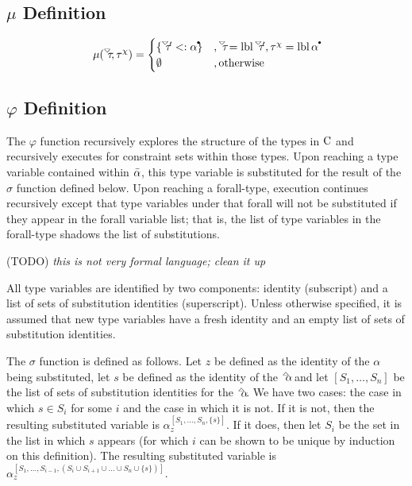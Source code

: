 \documentclass{article}
\begin{document}
\subsection*{$\mu$ Definition}

$$
\mu(\tauDownOpen, \tauChi) =
    \begin{cases}
        \{ \tauDownOpen' <: \alphaClosed \}             &, \tauDownOpen = \lbl \tauDownOpen', \tauChi = \lbl \alphaClosed \\
        \emptyset                                       &, \text{otherwise}
    \end{cases}
$$

\subsection*{$\varphi$ Definition}

The $\varphi$ function recursively explores the structure of the types in $\operatorname{\textrm{C}}$ and recursively executes for constraint sets within those types.  Upon reaching a type variable contained within $\bar{\alpha}$, this type variable is substituted for the result of the $\sigma$ function defined below.  Upon reaching a forall-type, execution continues recursively except that type variables under that forall will not be substituted if they appear in the forall variable list; that is, the list of type variables in the forall-type shadows the list of substitutions.

(TODO) \textit{this is not very formal language; clean it up}

All type variables are identified by two components: identity (subscript) and a list of sets of substitution identities (superscript).  Unless otherwise specified, it is assumed that new type variables have a fresh identity and an empty list of sets of substitution identities.

The $\sigma$ function is defined as follows.  Let $z$ be defined as the identity of the $\alpha$ being substituted, let $s$ be defined as the identity of the $\alphaUp$ and let $[S_1,\ldots,S_n]$ be the list of sets of substitution identities for the $\alphaUp$.  We have two cases: the case in which $s \in S_i$ for some $i$ and the case in which it is not.  If it is not, then the resulting substituted variable is $\alpha_z^{[S_1,\ldots,S_n,\{s\}]}$.  If it does, then let $S_i$ be the set in the list in which $s$ appears (for which $i$ can be shown to be unique by induction on this definition).  The resulting substituted variable is $\alpha_z^{[S_1,\ldots,S_{i-1},(S_i \cup S_{i+1} \cup \ldots \cup S_n \cup \{s\})]}$.
\end{document}
